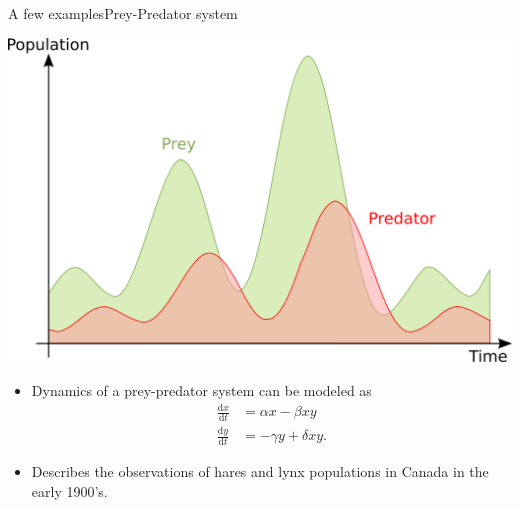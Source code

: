 \documentclass[usenames,dvipsnames,svgnames,10pt,aspectratio=169]{beamer}
\begin{document}
\begin{frame}[t, c]{A few examples}{Prey-Predator system}
	\begin{minipage}{.48\textwidth}
		\centering
		\includegraphics[width=\textwidth]{Lotka_Volterra}
	\end{minipage}%
	\hfill
	\begin{minipage}{.48\textwidth}
		\begin{itemize}
			\item Dynamics of a prey-predator system can be modeled as
			\[
				\begin{aligned}
					\frac{\mathrm{d}x}{\mathrm{d}t} & = \alpha x - \beta xy \\
					\frac{\mathrm{d}y}{\mathrm{d}t} & = - \gamma y + \delta xy.
				\end{aligned}
			\]
			\medskip

			\item Describes the observations of hares and lynx populations in Canada in the early 1900's.
		\end{itemize}
	\end{minipage}

	\vspace{1cm}
\end{frame}
\end{document}
